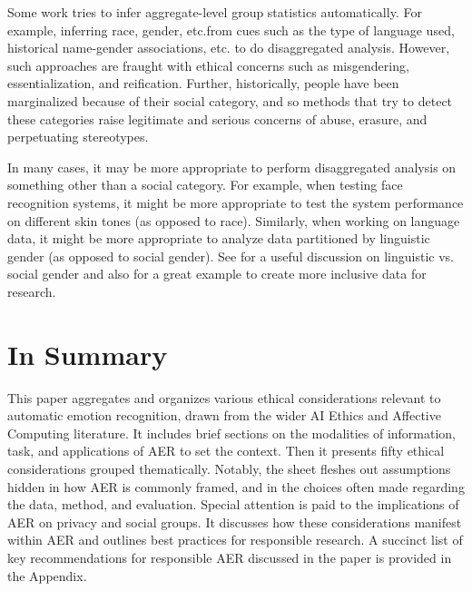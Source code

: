 \documentclass{clv3}
\begin{document}
Some work tries to infer aggregate-level group statistics automatically. For example, inferring race, gender, etc.\@ from cues such as the type of language used, historical name-gender associations, etc. to do disaggregated analysis. However, such approaches are fraught with ethical concerns such as misgendering, essentialization, and reification. Further, historically, people have been marginalized because of their social category, and so methods that try to detect these categories raise legitimate and serious concerns of abuse, erasure, and perpetuating stereotypes.

In many cases, it may be more appropriate to perform disaggregated analysis on something other than a social category. For example, when testing face recognition systems, it might be more appropriate to test the system performance on different skin tones (as opposed to race). Similarly, when working on language data, it might be more appropriate to analyze data partitioned by linguistic gender (as opposed to social gender). See \citet{cao2021toward} for a useful discussion on linguistic vs. social gender and also for a great example to create more inclusive data for research.\\



\section{In Summary}
This paper aggregates and organizes various ethical considerations relevant to automatic emotion recognition, drawn from the wider AI Ethics and Affective Computing literature. It includes brief sections on the modalities of information, task, and applications of AER to set the context. Then it presents fifty ethical considerations grouped thematically. 
Notably, the sheet fleshes out assumptions hidden in how AER is commonly framed, and in the choices often made regarding the data, method, and evaluation. Special attention is paid to the implications of AER  on privacy and social groups.
It discusses how these considerations manifest within AER and outlines best practices for responsible research.
A succinct list of key recommendations for responsible AER discussed in the paper is provided in the Appendix.
\end{document}
